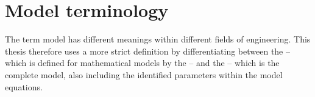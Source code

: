 \section{Model terminology} \label{sec:terminology}
The term model has different meanings within different fields of engineering.
This thesis therefore uses a more strict definition by differentiating between the  -- which is defined for mathematical models by the  -- and the  -- which is the complete model, also including the identified parameters within the model equations. 